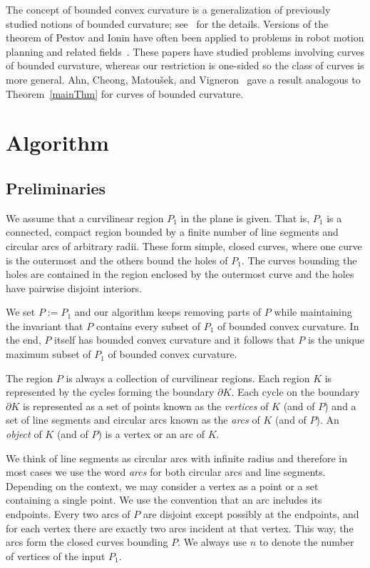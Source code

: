 \documentclass{article}
\newcommand{\PP}{P}
\newcommand{\KO}{K}
\newcommand{\mydef}{:=}
\begin{document}
The concept of bounded convex curvature is a generalization of previously studied notions of bounded curvature; see~\cite{aam2019disks} for the details.
Versions of the theorem of Pestov and Ionin have often been applied to problems in robot motion planning and related fields~\cite{agarwal2002curvature,ahn2012reachability,ayala2015length,lazard2002complexity,lee2000approximation}.
These papers have studied problems involving curves of bounded curvature, whereas our restriction is one-sided so the class of curves is more general.
Ahn, Cheong, Matou{\v{s}}ek, and Vigneron~\cite[Lemma 2]{ahn2012reachability} gave a result analogous to Theorem~\ref{mainThm} for curves of bounded curvature.

\section{Algorithm}\label{algoDescription}

\subsection{Preliminaries}

We assume that a curvilinear region $\PP_1$ in the plane is given.
That is, $\PP_1$ is a connected, compact region bounded by a finite number of line segments and circular arcs of arbitrary radii.
These form simple, closed curves, where one curve is the outermost and the others bound the holes of $\PP_1$.
The curves bounding the holes are contained in the region enclosed by the outermost curve and the holes have pairwise disjoint interiors.

We set $\PP\mydef \PP_1$ and our algorithm keeps removing parts of $\PP$
while maintaining the invariant that
$\PP$ contains every subset of
$\PP_1$ of bounded convex curvature.
In the end, $\PP$ itself has bounded convex curvature and it follows
that $\PP$ is the unique maximum subset of $\PP_1$
of bounded convex curvature.

The region $\PP$ is always a collection of curvilinear regions.
Each region $\KO$ is represented by the cycles forming the boundary $\partial\KO$.
Each cycle on the boundary $\partial\KO$ is represented as a set of points known as the \emph{vertices}
of $\KO$ (and of $\PP$) and a set of line segments and circular arcs known as the \emph{arcs}
of $\KO$ (and of $\PP$).
An \emph{object} of $\KO$ (and of $\PP$) is a vertex or an arc of $\KO$.

We think of line segments as circular arcs with infinite radius and therefore in most cases we use the word \emph{arcs} for both circular arcs and line segments.
Depending on the context, we may consider a vertex as a point or a set
containing a single point.
We use the convention that an arc includes its endpoints.
Every two arcs of $\PP$ are disjoint except possibly at the endpoints, and
for each vertex there are exactly two arcs incident at that vertex.
This way, the arcs form the closed curves bounding $\PP$.
We always use $n$ to denote the number of vertices of the input $\PP_1$.
\end{document}

